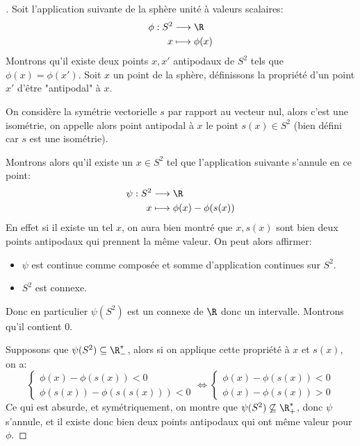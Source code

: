 \documentclass{report}
\begin{document}
   \begin{proof}[\unskip\nopunct]
      Soit l'application suivante de la sphère unité à valeurs scalaires:
      \[
         \begin{aligned}
            \phi : S^2 &\longrightarrow \R \\
            x &\longmapsto \phi(x) 
         \end{aligned}
      \]
      Montrons qu'il existe deux points \(x, x'\) antipodaux de \(S^2\) tels que \(\phi(x) = \phi(x')\). Soit \(x\) un point de la sphère, définissons la propriété d'un point \(x'\) d'être "antipodal" à \(x\).\<

      On considère la symétrie vectorielle \(s\) par rapport au vecteur nul, alors c'est une isométrie, on appelle alors point antipodal à \(x\) le point \(s(x) \in S^2\) (bien défini car \(s\) est une isométrie).\<

      Montrons alors qu'il existe un \(x \in S^2\) tel que l'application suivante s'annule en ce point:
      \[
         \begin{aligned}
            \psi : S^2 &\longrightarrow \R  \\
            x &\longmapsto \phi(x) - \phi(s(x))
         \end{aligned}
      \]
      En effet si il existe un tel \(x\), on aura bien montré que \(x, s(x)\) sont bien deux points antipodaux qui prennent la même valeur. On peut alors affirmer:
      \begin{itemize}
         \item \(\psi\) est continue comme composée et somme d'application continues sur \(S^2\).
         \item \(S^2\) est connexe.
      \end{itemize}
      Donc en particulier \(\psi(S^2)\) est un connexe de \(\R\) donc un intervalle. Montrons qu'il contient \(0\).\<

      Supposons que \(\psi(S^2) \subseteq \R_{-}^*\), alors si on applique cette propriété à \(x\) et \(s(x)\), on a:
      \[
         \begin{cases}
            \phi(x) - \phi(s(x)) < 0\\
            \phi(s(x)) - \phi(s(s(x))) < 0
         \end{cases} \Longleftrightarrow 
         \begin{cases}
            \phi(x) - \phi(s(x)) < 0\\
            \phi(x) - \phi(s(x)) > 0
         \end{cases} 
      \]
      Ce qui est absurde, et symétriquement, on montre que \(\psi(S^2) \not\subseteq \R_{+}^*\), donc \(\psi\) s'annule, et il existe donc bien deux points antipodaux qui ont même valeur pour \(\phi\).
   \end{proof}
\end{document}
